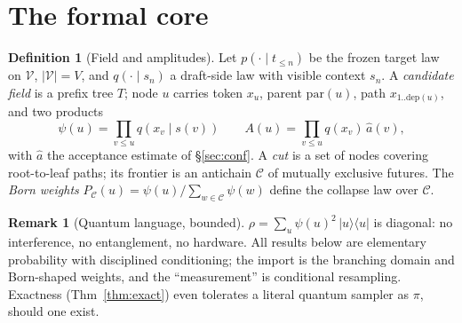 \documentclass[11pt,a4paper]{article}
\theoremstyle{definition}
\newtheorem{definition}[theorem]{Definition}
\newtheorem{remark}[theorem]{Remark}
\begin{document}
\section{The formal core}
\label{sec:core}
\begin{definition}[Field and amplitudes]
\label{def:field}
Let $p(\cdot\mid t_{\le n})$ be the frozen target law on $\mathcal V$,
$|\mathcal V|=V$, and $q(\cdot\mid s_n)$ a draft-side law with visible
context $s_n$. A \emph{candidate field} is a prefix tree $T$; node
$u$ carries token $x_u$, parent $\mathrm{par}(u)$, path
$x_{1..\mathrm{dep}(u)}$, and two products
\begin{equation}
\psi(u)=\!\!\prod_{v\le u}\!\! q(x_v\mid s(v))
\qquad
A(u)=\!\!\prod_{v\le u}\!\! q(x_v)\,\hat a(v),
\end{equation}
with $\hat a$ the acceptance estimate of \S\ref{sec:conf}.
A \emph{cut} is a set of nodes covering root-to-leaf paths; its frontier is
an antichain $\mathcal C$ of mutually exclusive futures. The \emph{Born
weights} $P_{\mathcal C}(u)=\psi(u)/\sum_{w\in\mathcal C}\psi(w)$ define the
collapse law over $\mathcal C$.
\end{definition}
\begin{remark}[Quantum language, bounded]
$\rho=\sum_u \psi(u)^2\,|u\rangle\langle u|$ is diagonal: no interference,
no entanglement, no hardware. All results below are elementary probability
with disciplined conditioning; the import is the branching domain and
Born-shaped weights, and the ``measurement'' is conditional resampling.
Exactness (Thm~\ref{thm:exact}) even tolerates a literal quantum sampler as
$\pi$, should one exist.
\end{remark}
\end{document}

